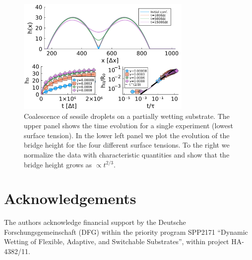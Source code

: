 \begin{figure}
    \centering
    \includegraphics[width = 0.75\textwidth]{graphics/drop_coal.png}
    \caption{Coalescence of sessile droplets on a partially wetting substrate. The upper panel shows the time evolution for a single experiment (lowest surface tension). In the lower left panel we plot the evolution of the bridge height for the four different surface tensions. To the right we normalize the data with characteristic quantities and show that the bridge height grows as $\propto t^{2/3}$.}
    \label{fig:coalesence}
\end{figure}

\section{Acknowledgements}

The authors acknowledge financial support by the Deutsche Forschungsgemeinschaft (DFG) within the priority program SPP2171 ``Dynamic Wetting of Flexible, Adaptive, and Switchable Substrates'', within project HA-4382/11.